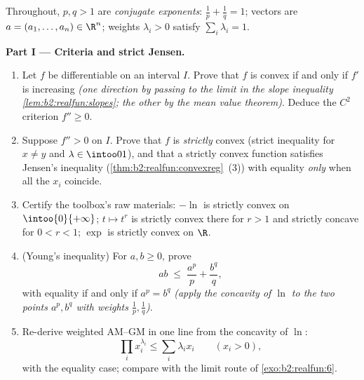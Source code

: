 \begin{problem}
\label{pb:b2:realfun:1}
Throughout, $p, q > 1$ are \emph{conjugate exponents}: $\frac1p +
\frac1q = 1$; vectors are $a = (a_1, \dots, a_n) \in \R^n$;
weights $\lambda_i > 0$ satisfy $\sum_i\lambda_i = 1$.

\medskip
\noindent\textbf{Part I --- Criteria and strict Jensen.}
\begin{enumerate}
  \item Let $f$ be differentiable on an interval $I$. Prove that
        $f$ is convex if and only if $f'$ is increasing
        \emph{(one direction by passing to the limit in the
        slope inequality \cref{lem:b2:realfun:slopes}; the
        other by the mean value theorem)}. Deduce the $C^2$
        criterion $f'' \geq 0$.
  \item Suppose $f''> 0$ on $I$. Prove that $f$ is
        \emph{strictly} convex (strict inequality for $x \neq y$
        and $\lambda \in \intoo01$), and that a strictly convex
        function satisfies Jensen's inequality
        (\cref{thm:b2:realfun:convexreg}~(3)) with equality
        \emph{only} when all the $x_i$ coincide.
  \item Certify the toolbox's raw materials: $-\ln$ is strictly
        convex on $\intoo{0}{+\infty}$; $t \mapsto t^r$ is
        strictly convex there for $r > 1$ and strictly concave
        for $0 < r < 1$; $\exp$ is strictly convex on $\R$.
  \item (Young's inequality) For $a, b \geq 0$, prove
        \[
        ab \;\leq\; \frac{a^p}{p} + \frac{b^q}{q},
        \]
        with equality if and only if $a^p = b^q$ \emph{(apply
        the concavity of $\ln$ to the two points $a^p, b^q$
        with weights $\frac1p, \frac1q$)}.
  \item Re-derive weighted AM--GM in one line from the
        concavity of $\ln$:
        \[
        \prod_i x_i^{\lambda_i} \leq \sum_i\lambda_ix_i \qquad
        (x_i > 0),
        \]
        with the equality case; compare with the limit route of
        \cref{exo:b2:realfun:6}.
\end{enumerate}


\end{problem}
